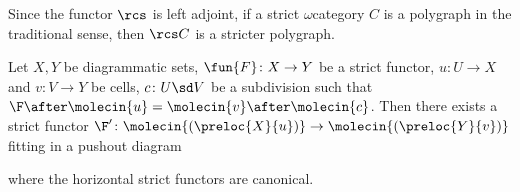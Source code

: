 
\begin{rmk} \label{rmk:reflection_of_polygraph_is_stricter_polygraph}
    Since the functor \( \rcs \) is left adjoint, if a strict \( \omega \)\nbd category \( C \) is a polygraph in the traditional sense, then \( \rcs C \) is a stricter polygraph.
\end{rmk}



\begin{lem}
    Let \( X, Y \) be diagrammatic sets, \( \fun{F} \colon X \to Y \) be a strict functor, \( u \colon U \to X \) and \( v \colon V \to Y \) be cells, \( c \colon U \sd V \) be a subdivision such that \( \F \after \molecin{u} = \molecin{v} \after \molecin{c} \).
    Then there exists a strict functor \( \F' \colon \molecin{(\preloc{X}{u})} \to \molecin{(\preloc{Y}{v})} \) fitting in a pushout diagram
    \begin{center}
    \end{center}
    where the horizontal strict functors are canonical.
\end{lem}
